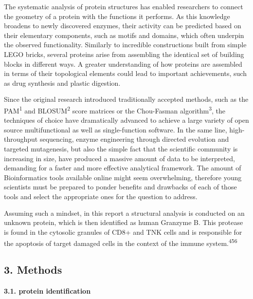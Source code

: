 \documentclass[
]{article}
\begin{document}
The systematic analysis of protein structures has enabled researchers to connect the geometry of a protein with the functions it performs. As this knowledge broadens to newly discovered enzymes, their activity can be predicted based on their elementary components, such as motifs and domains, which often underpin the observed functionality. Similarly to incredible constructions built from simple LEGO bricks, several proteins arise from assembling the identical set of building blocks in different ways. A greater understanding of how proteins are assembled in terms of their topological elements could lead to important achievements, such as drug synthesis and plastic digestion.

Since the original research introduced traditionally accepted methods, such as the PAM\textsuperscript{1} and BLOSUM\textsuperscript{2} score matrices or the Chou-Fasman algorithm\textsuperscript{3}, the techniques of choice have dramatically advanced to achieve a large variety of open source multifunctional as well as single-function software. In the same line, high-throughput sequencing, enzyme engineering through directed evolution and targeted mutagenesis, but also the simple fact that the scientific community is increasing in size, have produced a massive amount of data to be interpreted, demanding for a faster and more effective analytical framework. The amount of Bioinformatics tools available online might seem overwhelming, therefore young scientists must be prepared to ponder benefits and drawbacks of each of those tools and select the appropriate ones for the question to address.

Assuming such a mindset, in this report a structural analysis is conducted on an unknown protein, which is then identified as human Granzyme B. This protease is found in the cytosolic granules of CD8+ and TNK cells and is responsible for the apoptosis of target damaged cells in the context of the immune system.\textsuperscript{4}\textsuperscript{5}\textsuperscript{6}

\hypertarget{methods}{%
\subsection*{3. Methods}\label{methods}}

\hypertarget{protein-identification}{%
\paragraph{3.1. protein identification}\label{protein-identification}}
\end{document}
